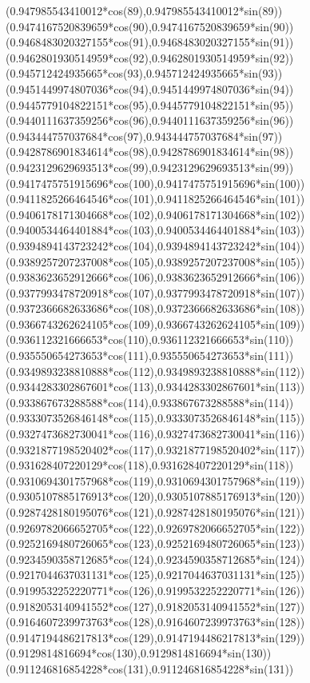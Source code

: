 {({0.947985543410012*cos(89)},{0.947985543410012*sin(89)})
({0.9474167520839659*cos(90)},{0.9474167520839659*sin(90)})
({0.9468483020327155*cos(91)},{0.9468483020327155*sin(91)})
({0.9462801930514959*cos(92)},{0.9462801930514959*sin(92)})
({0.945712424935665*cos(93)},{0.945712424935665*sin(93)})
({0.9451449974807036*cos(94)},{0.9451449974807036*sin(94)})
({0.9445779104822151*cos(95)},{0.9445779104822151*sin(95)})
({0.9440111637359256*cos(96)},{0.9440111637359256*sin(96)})
({0.943444757037684*cos(97)},{0.943444757037684*sin(97)})
({0.9428786901834614*cos(98)},{0.9428786901834614*sin(98)})
({0.9423129629693513*cos(99)},{0.9423129629693513*sin(99)})
({0.9417475751915696*cos(100)},{0.9417475751915696*sin(100)})
({0.9411825266464546*cos(101)},{0.9411825266464546*sin(101)})
({0.9406178171304668*cos(102)},{0.9406178171304668*sin(102)})
({0.9400534464401884*cos(103)},{0.9400534464401884*sin(103)})
({0.9394894143723242*cos(104)},{0.9394894143723242*sin(104)})
({0.9389257207237008*cos(105)},{0.9389257207237008*sin(105)})
({0.9383623652912666*cos(106)},{0.9383623652912666*sin(106)})
({0.9377993478720918*cos(107)},{0.9377993478720918*sin(107)})
({0.9372366682633686*cos(108)},{0.9372366682633686*sin(108)})
({0.9366743262624105*cos(109)},{0.9366743262624105*sin(109)})
({0.936112321666653*cos(110)},{0.936112321666653*sin(110)})
({0.935550654273653*cos(111)},{0.935550654273653*sin(111)})
({0.9349893238810888*cos(112)},{0.9349893238810888*sin(112)})
({0.9344283302867601*cos(113)},{0.9344283302867601*sin(113)})
({0.933867673288588*cos(114)},{0.933867673288588*sin(114)})
({0.9333073526846148*cos(115)},{0.9333073526846148*sin(115)})
({0.9327473682730041*cos(116)},{0.9327473682730041*sin(116)})
({0.9321877198520402*cos(117)},{0.9321877198520402*sin(117)})
({0.931628407220129*cos(118)},{0.931628407220129*sin(118)})
({0.9310694301757968*cos(119)},{0.9310694301757968*sin(119)})
({0.9305107885176913*cos(120)},{0.9305107885176913*sin(120)})
({0.9287428180195076*cos(121)},{0.9287428180195076*sin(121)})
({0.9269782066652705*cos(122)},{0.9269782066652705*sin(122)})
({0.9252169480726065*cos(123)},{0.9252169480726065*sin(123)})
({0.9234590358712685*cos(124)},{0.9234590358712685*sin(124)})
({0.9217044637031131*cos(125)},{0.9217044637031131*sin(125)})
({0.9199532252220771*cos(126)},{0.9199532252220771*sin(126)})
({0.9182053140941552*cos(127)},{0.9182053140941552*sin(127)})
({0.9164607239973763*cos(128)},{0.9164607239973763*sin(128)})
({0.9147194486217813*cos(129)},{0.9147194486217813*sin(129)})
({0.9129814816694*cos(130)},{0.9129814816694*sin(130)})
({0.911246816854228*cos(131)},{0.911246816854228*sin(131)})
}
